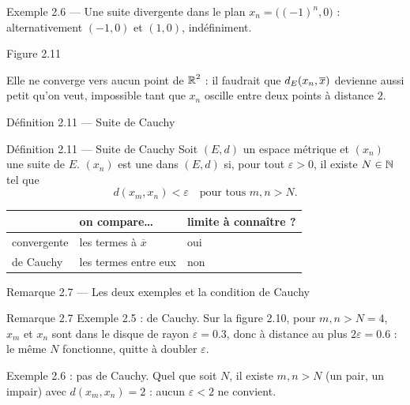 \begin{frame}{Exemple 2.6 --- Une suite divergente dans le plan}
  \small $x_n = \big((-1)^n,0\big)$ : alternativement $(-1,0)$ et
  $(1,0)$, indéfiniment.
  \begin{center}\scriptsize Figure 2.11\end{center}
  \small Elle ne converge vers aucun point de $\operatorname{\mathbb{R}}^2$ : il faudrait que
  $d_E(x_n,\overline{x})$ devienne aussi petit qu'on veut, impossible
  tant que $x_n$ oscille entre deux points à distance $2$.
\end{frame}

\begin{frame}{Définition 2.11 --- Suite de Cauchy}
  \begin{Enonce}{Définition 2.11 --- Suite de Cauchy}
    Soit $(E,d)$ un espace métrique et $(x_n)$ une suite de $E$. $(x_n)$
    est une  dans $(E,d)$ si, pour tout
    $\varepsilon>0$, il existe $N\in\operatorname{\mathbb{N}}$ tel que
    \[
      d(x_m,x_n)<\varepsilon \quad\text{pour tous } m,n>N.
    \]
  \end{Enonce}
  \begin{center}
  \small
  \begin{tabular}{lll}
    \toprule
    & on compare… & limite à connaître ? \\
    \midrule
    convergente & les termes à $\overline{x}$ & oui \\
    de Cauchy & les termes entre eux & non \\
    \bottomrule
  \end{tabular}
  \end{center}
\end{frame}

\begin{frame}{Remarque 2.7 --- Les deux exemples et la condition de Cauchy}
  \begin{Rem}{Remarque 2.7}
    \small
    Exemple 2.5 : de Cauchy. Sur la figure 2.10, pour
    $m,n>N=4$, $x_m$ et $x_n$ sont dans le disque de rayon
    $\varepsilon=\num{0.3}$, donc à distance au plus
    $2\varepsilon=\num{0.6}$ : le même $N$ fonctionne, quitte à doubler
    $\varepsilon$.
    \vspace{4pt}

    Exemple 2.6 : pas de Cauchy. Quel que soit $N$, il existe
    $m,n>N$ (un pair, un impair) avec $d(x_m,x_n)=2$ : aucun
    $\varepsilon<2$ ne convient.
  \end{Rem}
\end{frame}

